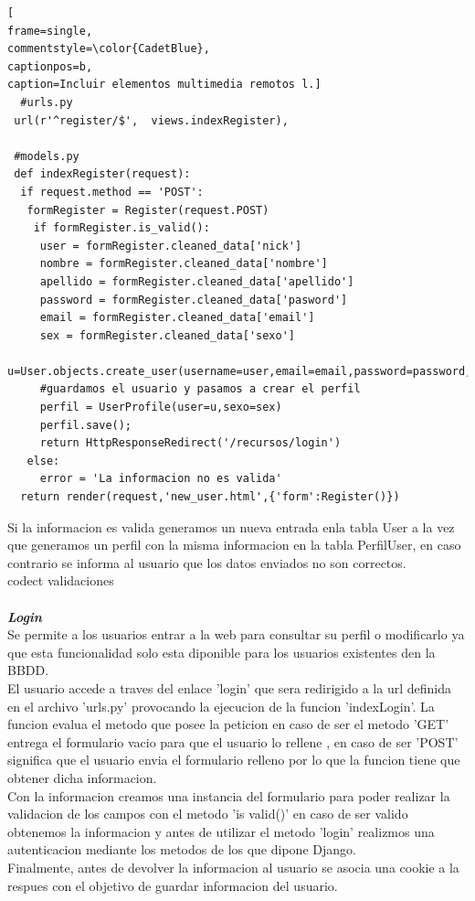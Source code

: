 \begin{lstlisting}[
frame=single,
commentstyle=\color{CadetBlue},
captionpos=b,
caption=Incluir elementos multimedia remotos l.]
  #urls.py
 url(r'^register/$',  views.indexRegister),

 #models.py
 def indexRegister(request):
  if request.method == 'POST':
   formRegister = Register(request.POST)
    if formRegister.is_valid():
     user = formRegister.cleaned_data['nick']
     nombre = formRegister.cleaned_data['nombre']
     apellido = formRegister.cleaned_data['apellido']
     password = formRegister.cleaned_data['pasword']
     email = formRegister.cleaned_data['email']
     sex = formRegister.cleaned_data['sexo']
     u=User.objects.create_user(username=user,email=email,password=password,first_name=nombre,last_name=apellido)
     #guardamos el usuario y pasamos a crear el perfil
     perfil = UserProfile(user=u,sexo=sex)
     perfil.save();
     return HttpResponseRedirect('/recursos/login')
   else:
     error = 'La informacion no es valida'
  return render(request,'new_user.html',{'form':Register()})
\end{lstlisting}
Si la informacion es valida generamos un nueva entrada enla tabla User a la vez que generamos un perfil con la misma informacion en la tabla PerfilUser, en caso contrario se informa al usuario que los datos enviados no son correctos.
\\ codect validaciones 
\\
\\\textbf{\textit{Login}}
\\Se permite a los usuarios entrar a la web para consultar su perfil o modificarlo ya que esta funcionalidad solo esta diponible para los usuarios existentes den la BBDD. 
\\El usuario accede a traves del enlace 'login' que sera redirigido a la url definida en el archivo 'urls.py' provocando la ejecucion de la funcion 'indexLogin'. La funcion evalua el metodo que posee la peticion en caso de ser el metodo 'GET' entrega el formulario vacio para que el usuario lo rellene , en caso de ser 'POST' significa que el usuario envia el formulario relleno por lo que la funcion tiene que obtener dicha informacion.
\\Con la informacion creamos una instancia del formulario para poder realizar la validacion de los campos con el metodo 'is valid()' en caso de ser valido obtenemos la informacion y antes de utilizar el metodo 'login' realizmos una autenticacion mediante los metodos  de los que dipone Django.
\\Finalmente, antes de devolver la informacion al usuario se asocia una cookie a la respues con el objetivo de guardar informacion del usuario. 
